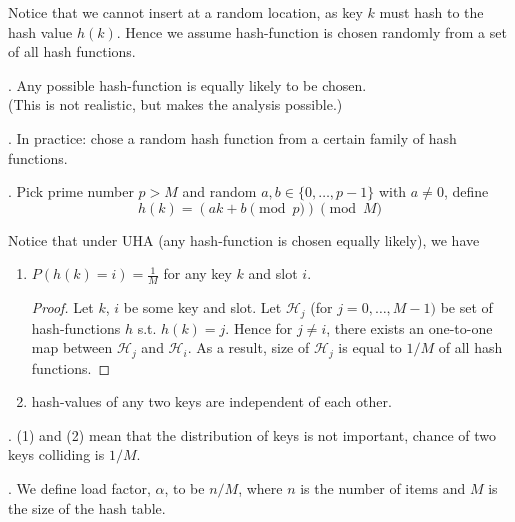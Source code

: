 \documentclass{article}
\begin{document}
\begin{solution}
    Notice that we cannot insert at a random location, as key $k$ must hash to the hash value $h(k)$. Hence we assume hash-function is chosen randomly from a set of all hash functions. 
\end{solution}

\begin{thmm}.
    Any possible hash-function is equally likely to be chosen. \\
    (This is not realistic, but makes the analysis possible.) 
    \begin{comm}[].
        In practice: chose a random hash function from a certain family of hash functions. \begin{examplee}[].
            Pick prime number $p > M$ and random $a, b \in \{0, \ldots, p-1\}$ with $a \neq 0$, define  
            \[ h(k) = (ak + b \pmod{p}) \pmod{M} \]
        \end{examplee}
    \end{comm}
\end{thmm}

Notice that under UHA (any hash-function is chosen equally likely), we have 
\begin{enumerate}
    \item $\displaystyle P( h(k) = i ) = \frac{1}{M}$ for any key $k$ and slot $i$. \begin{proof}
        Let $k$, $i$ be some key and slot. Let $\mathcal{H}_j$ (for $j = 0, \ldots, M -1)$ be set of hash-functions $h$ s.t. $h(k) = j$. Hence for $j \neq i$, there exists an one-to-one map between $\mathcal{H}_j$ and $\mathcal{H}_i$. As a result, size of $\mathcal{H}_j$ is equal to $1 / M$ of all hash functions. 
    \end{proof}
    \item hash-values of any two keys are independent of each other. 
\end{enumerate}

\begin{result}[].
    (1) and (2) mean that the distribution of keys is not important, chance of two keys colliding is $1 / M$. 
\end{result}

\begin{deff}.
    We define load factor, $\alpha$, to be $n / M$, where $n$ is the number of items and $M$ is the size of the hash table. 
\end{deff}
\end{document}
